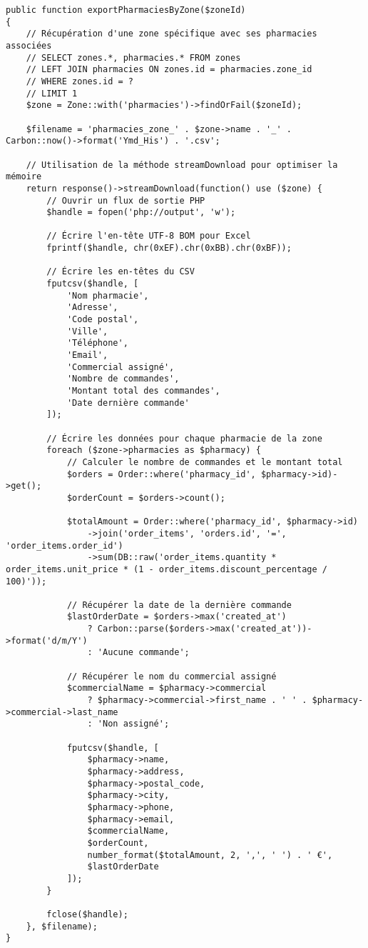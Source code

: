 \documentclass[12pt,a4paper]{article}
\begin{document}
\begin{lstlisting}[caption=Méthode exportPharmaciesByZone]
public function exportPharmaciesByZone($zoneId)
{
    // Récupération d'une zone spécifique avec ses pharmacies associées
    // SELECT zones.*, pharmacies.* FROM zones
    // LEFT JOIN pharmacies ON zones.id = pharmacies.zone_id
    // WHERE zones.id = ?
    // LIMIT 1
    $zone = Zone::with('pharmacies')->findOrFail($zoneId);
    
    $filename = 'pharmacies_zone_' . $zone->name . '_' . Carbon::now()->format('Ymd_His') . '.csv';
    
    // Utilisation de la méthode streamDownload pour optimiser la mémoire
    return response()->streamDownload(function() use ($zone) {
        // Ouvrir un flux de sortie PHP
        $handle = fopen('php://output', 'w');
        
        // Écrire l'en-tête UTF-8 BOM pour Excel
        fprintf($handle, chr(0xEF).chr(0xBB).chr(0xBF));
        
        // Écrire les en-têtes du CSV
        fputcsv($handle, [
            'Nom pharmacie',
            'Adresse',
            'Code postal',
            'Ville',
            'Téléphone',
            'Email',
            'Commercial assigné',
            'Nombre de commandes',
            'Montant total des commandes',
            'Date dernière commande'
        ]);
        
        // Écrire les données pour chaque pharmacie de la zone
        foreach ($zone->pharmacies as $pharmacy) {
            // Calculer le nombre de commandes et le montant total
            $orders = Order::where('pharmacy_id', $pharmacy->id)->get();
            $orderCount = $orders->count();
            
            $totalAmount = Order::where('pharmacy_id', $pharmacy->id)
                ->join('order_items', 'orders.id', '=', 'order_items.order_id')
                ->sum(DB::raw('order_items.quantity * order_items.unit_price * (1 - order_items.discount_percentage / 100)'));
            
            // Récupérer la date de la dernière commande
            $lastOrderDate = $orders->max('created_at') 
                ? Carbon::parse($orders->max('created_at'))->format('d/m/Y') 
                : 'Aucune commande';
            
            // Récupérer le nom du commercial assigné
            $commercialName = $pharmacy->commercial 
                ? $pharmacy->commercial->first_name . ' ' . $pharmacy->commercial->last_name 
                : 'Non assigné';
            
            fputcsv($handle, [
                $pharmacy->name,
                $pharmacy->address,
                $pharmacy->postal_code,
                $pharmacy->city,
                $pharmacy->phone,
                $pharmacy->email,
                $commercialName,
                $orderCount,
                number_format($totalAmount, 2, ',', ' ') . ' €',
                $lastOrderDate
            ]);
        }
        
        fclose($handle);
    }, $filename);
}
\end{lstlisting}
\end{document}
